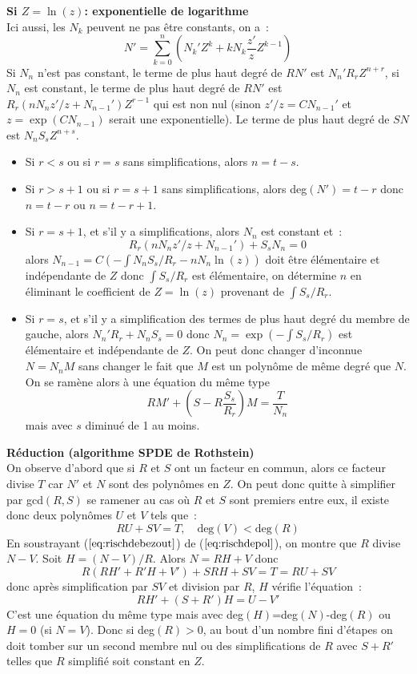 \documentclass[a4paper,11pt]{book}
\begin{document}
\begin{giacjshere}
{\bf Si $Z=\ln(z)$: exponentielle de logarithme}\\
Ici aussi, les $N_k$ peuvent ne pas être constants, on a~:
\[ N'=\sum_{k=0}^n (N_k'Z^k+kN_k \frac{z'}{z} Z^{k-1})\]
Si $N_n$ n'est pas constant, le terme de plus haut degré de 
$RN'$ est $N_n' R_r Z^{n+r}$, si $N_n$ est constant, 
le terme de plus haut degré de $RN'$ est $R_r(nN_nz'/z+N_{n-1}') Z^{r-1}$ 
qui est non nul (sinon $z'/z=CN_{n-1}'$ et $z=\exp(CN_{n-1})$ serait 
une exponentielle).
Le terme de plus haut degré de $SN$ est $N_n S_s Z^{n+s}$.
\begin{itemize}
\item Si $r<s$ ou si $r=s$ sans simplifications,
alors $n=t-s$.
\item Si $r>s+1$ ou si $r=s+1$ sans simplifications,
alors deg$(N')=t-r$ donc $n=t-r$ ou $n=t-r+1$.
\item Si $r=s+1$, et s'il y a simplifications, alors $N_n$ est constant et~:
\[ R_r(nN_nz'/z+N_{n-1}')+ S_s N_n = 0 \]
alors $N_{n-1}=C (-\int N_n S_s/R_r -n N_n \ln(z))$
doit être élémentaire et indépendante de $Z$ donc $\int S_s/R_r$
est élémentaire, on détermine $n$ en éliminant le coefficient de 
$Z=\ln(z)$ provenant de $\int S_s/R_r$.
\item Si $r=s$, et s'il y a simplification des termes 
de plus haut degré du membre de gauche, 
alors $N_n' R_r+N_n S_s=0$ donc $N_n=\exp(-\int S_s/R_r)$
est élémentaire et indépendante de $Z$. On peut donc changer
d'inconnue $N=N_n M$ sans changer le fait que $M$ est un polynôme de
même degré que $N$. On se ramène alors à une équation du même type
\[ RM'+(S-R \frac{S_s}{R_r})M= \frac{T}{N_n}\]
mais avec $s$ diminué de 1 au moins.
\end{itemize}

{\bf R\'eduction (algorithme SPDE de Rothstein)}\\
On observe d'abord que si $R$ et $S$ ont un facteur
en commun, alors ce facteur divise $T$ car $N'$ et $N$ sont des polyn\^omes
en $Z$. On peut donc quitte \`a simplifier par gcd$(R,S)$ se ramener
au cas o\`u $R$ et $S$ sont premiers entre eux, il existe donc deux
polyn\^omes $U$ et $V$ tels que~:
\begin{equation} \label{eq:rischdebezout}
RU+SV=T, \quad \mbox{deg}(V)< \mbox{deg}(R)
\end{equation}
En soustrayant (\(\ref{eq:rischdebezout}\)) de (\(\ref{eq:rischdepol}\)), 
on montre que $R$ divise $N-V$. Soit $H=(N-V)/R$. Alors $N=RH+V$ donc
\[ R (RH'+R'H+V')+SRH+SV= T=RU+SV\]
donc apr\`es simplification par $SV$ et division par $R$, 
$H$ v\'erifie l'\'equation~:
\[ R H' + (S+R') H = U - V'\]
C'est une \'equation du m\^eme type mais avec deg$(H)$=deg$(N)$-deg$(R)$
ou $H=0$ (si $N=V$).
Donc si deg$(R)>0$, au bout d'un nombre fini d'\'etapes on doit 
tomber sur un second membre nul ou des simplifications de $R$ avec $S+R'$
telles que $R$ simplifié soit constant en $Z$.


\end{giacjshere}
\end{document}
